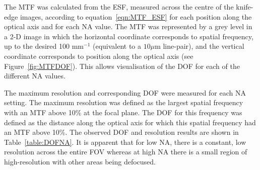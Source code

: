 The MTF was calculated from the ESF, measured across the centre of the knife-edge images, according to equation~\ref{eqn:MTF_ESF} for each position along the optical axis and for each NA value. The MTF was represented by a grey level in a 2-D image in which the horizontal coordinate corresponds to spatial frequency, up to the desired 100 mm$^{-1}$ (equivalent to a $10 \mu$m line-pair), and the vertical coordinate corresponds to position along the optical axis (see Figure~\ref{fig:MTFDOF}). This allows visualisation of the DOF for each of the different NA values.

The maximum resolution and corresponding DOF were measured for each NA setting. The maximum resolution was defined as the largest spatial frequency with an MTF above 10\% at the focal plane. The DOF for this frequency was defined as the distance along the optical axis for which this spatial frequency had an MTF above 10\%.  
The observed DOF and resolution results are shown in Table~\ref{table:DOFNA}.
It is apparent that for low NA, there is a constant, low resolution across the entire FOV whereas at high NA there is a small region of high-resolution with other areas being defocused. 



